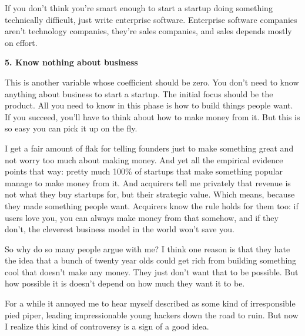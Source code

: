 If you don't think you're smart enough to
                    start a startup doing something technically difficult, just
                    write enterprise software. Enterprise software companies
                    aren't technology companies, they're sales companies, and
                    sales depends mostly on effort.

\textbf{5. Know nothing about business}

This is another variable whose coefficient
                    should be zero. You don't need to know anything about
                    business to start a startup. The initial focus should be the
                    product. All you need to know in this phase is how to build
                    things people want. If you succeed, you'll have to think
                    about how to make money from it. But this is so easy you can
                    pick it up on the fly.

I get a fair amount of
                    flak for telling founders just to make something great and
                    not worry too much about making money. And yet all the
                    empirical evidence points that way: pretty much 100\% of
                    startups that make something popular manage to make money
                    from it. And acquirers tell me privately that revenue is not
                    what they buy startups for, but their strategic value. Which
                    means, because they made something people want. Acquirers
                    know the rule holds for them too: if users love you, you can
                    always make money from that somehow, and if they don't, the
                    cleverest business model in the world won't save you.

So
                    why do so many people argue with me? I think one reason is
                    that they hate the idea that a bunch of twenty year olds
                    could get rich from building something cool that doesn't
                    make any money. They just don't want that to be possible.
                    But how possible it is doesn't depend on how much they want
                    it to be.

For a while it annoyed me to hear
                    myself described as some kind of irresponsible pied piper,
                    leading impressionable young hackers down the road to ruin.
                    But now I realize this kind of controversy is a sign of a
                    good idea.

